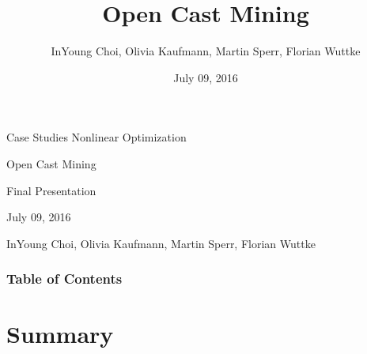 \documentclass{beamer}
\title[Kurzform]{Open Cast Mining}
\author{InYoung Choi, Olivia Kaufmann, Martin Sperr, Florian Wuttke}
\date{July 09, 2016}
\begin{document}

\begin{frame}[c]
	\begin{center}
		\large{Case Studies Nonlinear Optimization}
	\end{center}
	\vspace{0.5cm}
	\begin{center}
		\Huge{\textcolor{TUMblue2}{Open Cast Mining}}
	\end{center}
	\begin{center}
		\large{Final Presentation}
	\end{center}
	\vspace{0.5cm}
	\begin{center}
		July 09, 2016
	\end{center}
	\vspace{0.5cm}
	\begin{center}
		\small{InYoung Choi, Olivia Kaufmann, Martin Sperr, Florian Wuttke}
	\end{center}
\end{frame}

\begin{frame}[c]
	\frametitle{Table of Contents}
	\tableofcontents
\end{frame}





%






\section{Summary}
\end{document}
